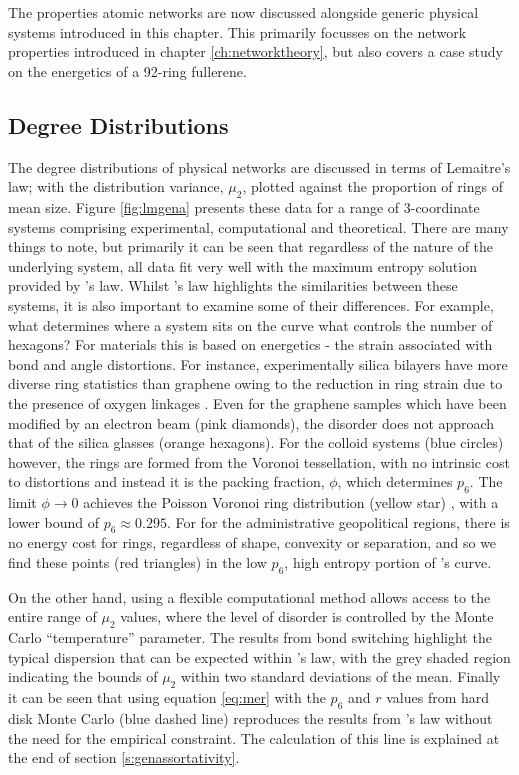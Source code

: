 The properties \td{} atomic networks are now discussed alongside generic physical systems introduced in this chapter.
This primarily focusses on the network properties introduced in chapter \ref{ch:networktheory}, but also covers a case study on the energetics of a 92\--ring fullerene.

\subsection{Degree Distributions}
\label{s:gendegreedist}

The degree distributions of physical networks are discussed in terms of Lemaitre's law; with the distribution variance, $\mu_2$, plotted against the proportion of rings of mean size.
Figure \ref{fig:lmgena} presents these data for a range of 3\--coordinate systems comprising experimental, computational and theoretical.
There are many things to note, but primarily it can be seen that regardless of the nature of the underlying system, all data fit very well with the maximum entropy solution provided by \lm{}'s law.
Whilst \lm's law highlights the similarities between these systems, it is also important to examine some of their differences. For example, what determines where a system sits on the \lm{} curve \ie{} what controls the number of hexagons?
For materials this is based on energetics \-- the strain associated with bond and angle distortions. For instance, experimentally silica bilayers have more diverse ring statistics than graphene owing to the reduction in ring strain due to the presence of oxygen linkages \cite{Buchner2017}.
Even for the graphene samples which have been modified by an electron beam (pink diamonds), the disorder does not approach that of the silica glasses (orange hexagons).
For the colloid systems (blue circles) however, the rings are formed from the Voronoi tessellation, with no intrinsic cost to distortions and instead it is the packing fraction, $\phi$, which determines $p_6$.
The limit $\phi\rightarrow 0$ achieves the Poisson Voronoi ring distribution (yellow star) \cite{Tanemura2003}, with a lower bound of $p_6 \approx 0.295$.
For for the administrative geopolitical regions, there is no energy cost for rings, regardless of shape, convexity or separation, and so we find these points (red triangles) in the low $p_6$, high entropy portion of \lm's{} curve.

On the other hand, using a flexible computational method allows access to the entire range of $\mu_2$ values, where the level of disorder is controlled by the Monte Carlo ``temperature'' parameter.
The results from bond switching highlight the typical dispersion that can be expected within \lm's{} law, with the grey shaded region indicating the bounds of $\mu_2$ within two standard deviations of the mean.
Finally it can be seen that using equation \eqref{eq:mer} with the $p_6$ and $r$ values from hard disk Monte Carlo (blue dashed line) reproduces the results from \lm's{} law without the need for the empirical constraint.
The calculation of this line is explained at the end of section \ref{s:genassortativity}.

